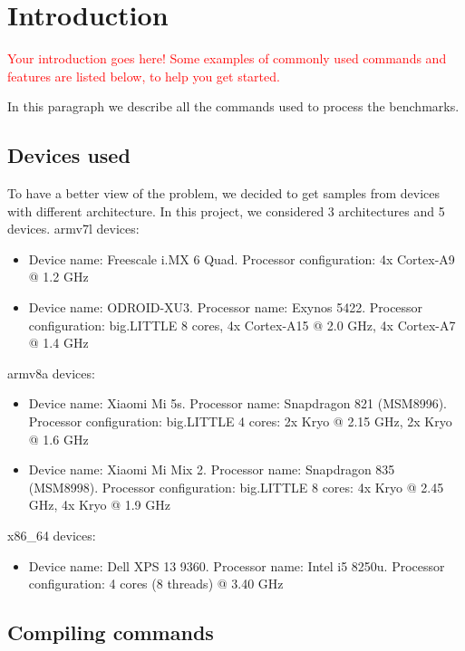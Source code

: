 \section{Introduction}

\textcolor{red}{Your introduction goes here! Some examples of commonly used commands and features are listed below, to help you get started.}

In this paragraph we describe all the commands used to process the benchmarks.

\subsection{Devices used}

To have a better view of the problem, we decided to get samples from devices with different architecture.
In this project, we considered 3 architectures and 5 devices.\newline 
armv7l devices:
\begin{itemize}
	\item Device name: Freescale i.MX 6 Quad. Processor configuration: 4x Cortex-A9 @ 1.2 GHz
	\item Device name: ODROID-XU3. Processor name: Exynos 5422. Processor configuration: big.LITTLE 8 cores, 4x Cortex-A15 @ 2.0 GHz, 4x Cortex-A7 @ 1.4 GHz 
\end{itemize}
armv8a devices:
\begin{itemize}
	\item Device name: Xiaomi Mi 5s. Processor name: Snapdragon 821 (MSM8996). Processor configuration: big.LITTLE 4 cores: 2x Kryo @ 2.15 GHz, 2x Kryo @ 1.6 GHz
	\item Device name: Xiaomi Mi Mix 2. Processor name: Snapdragon 835 (MSM8998). Processor configuration: big.LITTLE 8 cores: 4x Kryo @ 2.45 GHz, 4x Kryo @ 1.9 GHz
\end{itemize}
x86\_64 devices:
\begin{itemize}
	\item Device name: Dell XPS 13 9360. Processor name: Intel i5 8250u. Processor configuration: 4 cores (8 threads) @ 3.40 GHz
\end{itemize}
\subsection{Compiling commands}

